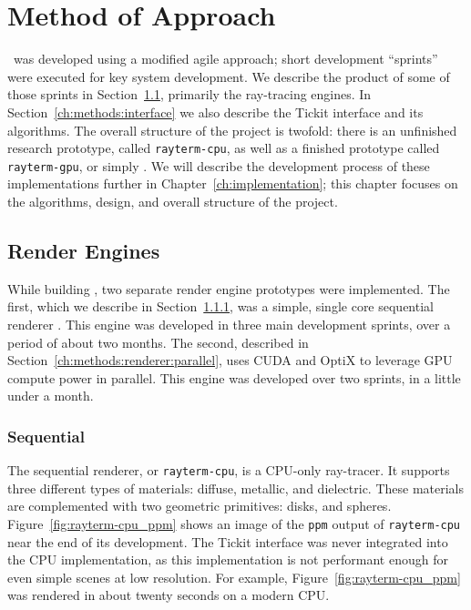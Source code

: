 %
%
%
\chapter{Method of Approach} \label{ch:methods}

\name\ was developed using a modified agile approach; short development ``sprints'' were executed for key system development.
We describe the product of some of those sprints in Section~\ref{ch:methods:renderer}, primarily the ray-tracing engines.
In Section~\ref{ch:methods:interface} we also describe the Tickit interface and its algorithms.
The overall structure of the project is twofold: there is an unfinished research prototype, called \texttt{rayterm-cpu}, as well as a finished prototype called \texttt{rayterm-gpu}, or simply \name.
We will describe the development process of these implementations further in Chapter~\ref{ch:implementation}; this chapter focuses on the algorithms, design, and overall structure of the project.


\section{Render Engines} \label{ch:methods:renderer}
While building \name, two separate render engine prototypes were implemented.
The first, which we describe in Section~\ref{ch:methods:renderer:sequential}, was a simple, single core sequential renderer \cite{raytermCpuImpl}.
This engine was developed in three main development sprints, over a period of about two months.
The second, described in Section~\ref{ch:methods:renderer:parallel}, uses CUDA \cite{nvidia2011cuda} and OptiX \cite{parker2010optix} to leverage GPU compute power in parallel.
This engine was developed over two sprints, in a little under a month.


\subsection{Sequential} \label{ch:methods:renderer:sequential}

The sequential renderer, or \texttt{rayterm-cpu}, is a CPU-only ray-tracer.
It supports three different types of materials: diffuse, metallic, and dielectric.
These materials are complemented with two geometric primitives: disks, and spheres.
Figure~\ref{fig:rayterm-cpu_ppm} shows an image of the \texttt{ppm} output of \texttt{rayterm-cpu} near the end of its development.
The Tickit interface was never integrated into the CPU implementation, as this implementation is not performant enough for even simple scenes at low resolution.
For example, Figure~\ref{fig:rayterm-cpu_ppm} was rendered in about twenty seconds on a modern CPU.

